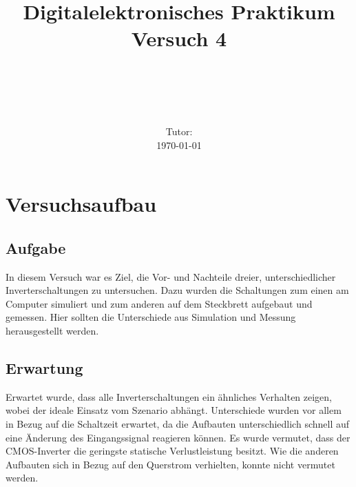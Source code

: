 \documentclass[11pt, a4paper]{article}
\title{\textbf{Digitalelektronisches Praktikum\\ Versuch 4}}
\author{\ATutantName \\ \emph{\ATutantEmail} \and \BTutantName\\ \emph{\BTutantEmail}}
\date{\Gruppennummer \\[3ex] Tutor: \Tutorname \\[3ex] \today}
\begin{document}
\clearpage
\maketitle
\thispagestyle{empty}
\newpage


\section*{Versuchsaufbau}
\subsection*{Aufgabe}
In diesem Versuch war es Ziel, die Vor- und Nachteile dreier, unterschiedlicher Inverterschaltungen zu untersuchen. Dazu wurden die Schaltungen zum einen am Computer simuliert und zum anderen auf dem Steckbrett aufgebaut und gemessen. Hier sollten die Unterschiede aus Simulation und Messung herausgestellt werden.
\subsection*{Erwartung}
Erwartet wurde, dass alle Inverterschaltungen ein ähnliches Verhalten zeigen, wobei der ideale Einsatz vom Szenario abhängt.
Unterschiede wurden vor allem in Bezug auf die Schaltzeit erwartet, da die Aufbauten unterschiedlich schnell auf eine Änderung des Eingangssignal reagieren können.
Es wurde vermutet, dass der CMOS-Inverter die geringste statische Verlustleistung besitzt. Wie die anderen Aufbauten sich in Bezug auf den Querstrom verhielten, konnte nicht vermutet werden.
\end{document}
